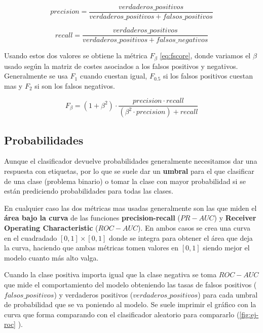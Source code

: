 \begin{equation}
  precision = \dfrac{verdaderos\_positivos}{verdaderos\_positivos + falsos\_positivos}
  \label{eq:precision}
\end{equation}

\begin{equation}
  recall = \dfrac{verdaderos\_positivos}{verdaderos\_positivos + falsos\_negativos}
  \label{eq:recall}
\end{equation}

Usando estos dos valores se obtiene la métrica $F_\beta$ \eqref{eq:fscore}, donde variamos el $\beta$ usado según la matriz de costes asociados a los falsos positivos y negativos. Generalmente se usa $F_1$ cuando cuestan igual, $F_{0.5}$ si los falsos positivos cuestan mas y $F_{2}$ si son los falsos negativos.

\begin{equation}
  F_\beta = (1 + \beta^2) \cdot \dfrac{precision \cdot recall}{(\beta^2 \cdot precision) + recall}
  \label{eq:fscore}
\end{equation}

\subsection{Probabilidades}

Aunque el clasificador devuelve probabilidades generalmente necesitamos dar una respuesta con etiquetas, por lo que se suele dar un \textbf{umbral} para el que clasificar de una clase (problema binario) o tomar la clase con mayor probabilidad si se están prediciendo probabilidades para todas las clases.

En cualquier caso las dos métricas mas usadas generalmente son las que miden el \textbf{área bajo la curva} de las funciones \textbf{precision-recall} ($PR-AUC$) y \textbf{Receiver Operating Characteristic} ($ROC-AUC$). En ambos casos se crea una curva en el cuadradado $[0,1] \times [0,1]$ donde se integra para obtener el área que deja la curva, haciendo que ambas métricas tomen valores en $[0, 1]$ siendo mejor el modelo cuanto más alto valga.

Cuando la clase positiva importa igual que la clase negativa se toma $ROC-AUC$ que mide el comportamiento del modelo obteniendo las tasas de falsos positivos ($falsos\_positivos$) y verdaderos positivos ($verdaderos\_positivos$) para cada umbral de probabilidad que se va poniendo al modelo. Se suele imprimir el gráfico con la curva que forma comparando con el clasificador aleatorio para compararlo (\autoref{fig:ej-roc} \cite{scikit2020roc}).

